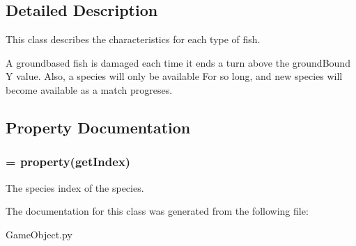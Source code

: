 \subsection{\-Detailed \-Description}
\-This class describes the characteristics for each type of fish. 

\-A groundbased fish is damaged each time it ends a turn above the ground\-Bound \-Y value. \-Also, a species will only be available \-For so long, and new species will become available as a match progreses. 

\subsection{\-Property \-Documentation}
\hypertarget{classGameObject_1_1Species_a7d1a4a8cff66144687f4c45a57e941ab}{
\subsubsection[{index}]{ = property(get\-Index)}}\label{classGameObject_1_1Species_a7d1a4a8cff66144687f4c45a57e941ab}


\-The species index of the species. 



\-The documentation for this class was generated from the following file\-:\begin{DoxyCompactItemize}
\item 
\-Game\-Object.\-py\end{DoxyCompactItemize}
